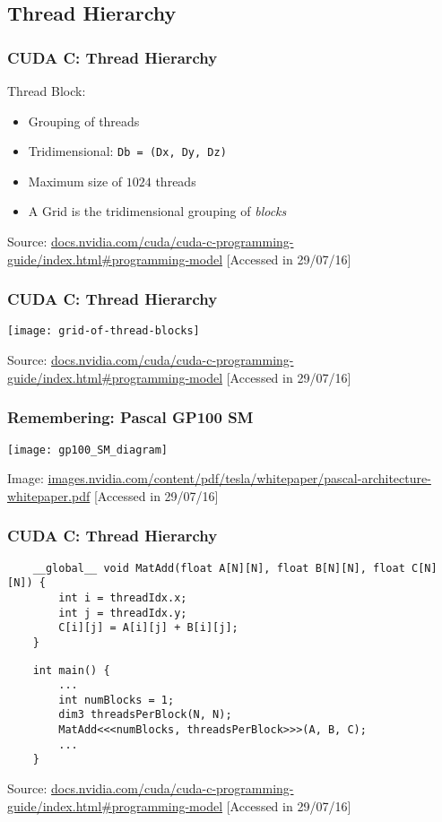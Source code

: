 \documentclass[10pt, compress]{beamer}
\begin{document}
\subsection{Thread Hierarchy}

\begin{frame}
    \frametitle{CUDA C: Thread Hierarchy}
    \alert{Thread Block}:
    \begin{itemize}
        \item Grouping of threads
            \pause
        \item \alert{Tridimensional}: \texttt{\footnotesize{Db = (Dx, Dy, Dz)}}
            \pause
        \item \alert{Maximum size} of $1024$ threads
            \pause
        \item A \alert{Grid} is the tridimensional grouping of \textit{blocks}
    \end{itemize}

    \vfill

    \begin{center}
        \tiny{Source: \url{docs.nvidia.com/cuda/cuda-c-programming-guide/index.html\#programming-model} [Accessed in 29/07/16]}
    \end{center}
\end{frame}

\begin{frame}
    \frametitle{CUDA C: Thread Hierarchy}
    \centering
    \texttt{[image: grid-of-thread-blocks]}

    \tiny{Source: \url{docs.nvidia.com/cuda/cuda-c-programming-guide/index.html\#programming-model} [Accessed in 29/07/16]}
\end{frame}

\begin{frame}
    \frametitle{Remembering: Pascal GP100 SM}
    \centering
    \texttt{[image: gp100\_SM\_diagram]}

    \vfill

    \tiny{Image: \url{images.nvidia.com/content/pdf/tesla/whitepaper/pascal-architecture-whitepaper.pdf} [Accessed in 29/07/16]}
\end{frame}

\begin{frame}[fragile]
    \frametitle{CUDA C: Thread Hierarchy}
    \begin{lstlisting}
    __global__ void MatAdd(float A[N][N], float B[N][N], float C[N][N]) {
        int i = threadIdx.x;
        int j = threadIdx.y;
        C[i][j] = A[i][j] + B[i][j];
    }
    \end{lstlisting}
    \pause
    \begin{lstlisting}
    int main() {
        ...
        int numBlocks = 1;
        dim3 threadsPerBlock(N, N);
        MatAdd<<<numBlocks, threadsPerBlock>>>(A, B, C);
        ...
    }
    \end{lstlisting}
    \vfill

    \begin{center}
        \tiny{Source: \url{docs.nvidia.com/cuda/cuda-c-programming-guide/index.html\#programming-model} [Accessed in 29/07/16]}
    \end{center}
\end{frame}
\end{document}
